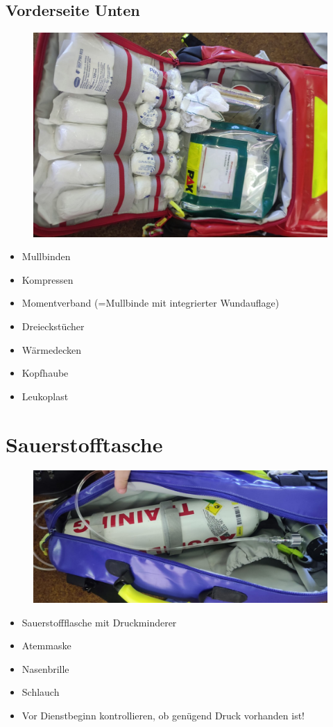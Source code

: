 \subsection*{Vorderseite Unten}
\begin{figure}[H]
    \centering
    \includegraphics[scale=.5]{res/rucksack_vorne_unten.png}
\end{figure}
\begin{itemize}
   \item Mullbinden
   \item Kompressen
   \item Momentverband (=Mullbinde mit integrierter Wundauflage)
   \item Dreieckstücher
   \item Wärmedecken
   \item Kopfhaube
   \item Leukoplast 
\end{itemize}

\section{Sauerstofftasche}
\begin{figure}[H]
    \centering
    \includegraphics[scale=.5]{res/sauerstofftasche.png}
\end{figure}
\begin{itemize}
    \item Sauerstoffflasche mit Druckminderer
    \item Atemmaske
    \item Nasenbrille
    \item Schlauch
    \item Vor Dienstbeginn kontrollieren, ob genügend Druck vorhanden ist!
\end{itemize}

